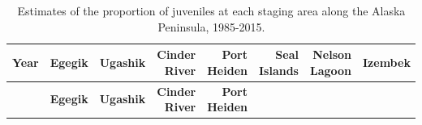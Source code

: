 \documentclass[]{article}
\begin{document}
\newpage

\noindent

\begin{longtable}[]{@{}rrrrrrrr@{}}
\caption{Estimates of the proportion of juveniles at each staging area
along the Alaska Peninsula, 1985-2015.}\tabularnewline
\toprule
\begin{minipage}[b]{0.08\columnwidth}\raggedleft\strut
\textbf{Year}\strut
\end{minipage} & \begin{minipage}[b]{0.10\columnwidth}\raggedleft\strut
\textbf{Egegik}\strut
\end{minipage} & \begin{minipage}[b]{0.11\columnwidth}\raggedleft\strut
\textbf{Ugashik}\strut
\end{minipage} & \begin{minipage}[b]{0.08\columnwidth}\raggedleft\strut
\textbf{Cinder River}\strut
\end{minipage} & \begin{minipage}[b]{0.14\columnwidth}\raggedleft\strut
\textbf{Port Heiden}\strut
\end{minipage} & \begin{minipage}[b]{0.09\columnwidth}\raggedleft\strut
\textbf{Seal Islands}\strut
\end{minipage} & \begin{minipage}[b]{0.08\columnwidth}\raggedleft\strut
\textbf{Nelson Lagoon}\strut
\end{minipage} & \begin{minipage}[b]{0.10\columnwidth}\raggedleft\strut
\textbf{Izembek}\strut
\end{minipage}\tabularnewline
\midrule
\endfirsthead
\toprule
\begin{minipage}[b]{0.08\columnwidth}\raggedleft\strut
~\strut
\end{minipage} & \begin{minipage}[b]{0.10\columnwidth}\raggedleft\strut
\textbf{Egegik}\strut
\end{minipage} & \begin{minipage}[b]{0.11\columnwidth}\raggedleft\strut
\textbf{Ugashik}\strut
\end{minipage} & \begin{minipage}[b]{0.08\columnwidth}\raggedleft\strut
\textbf{Cinder River}\strut
\end{minipage} & \begin{minipage}[b]{0.14\columnwidth}\raggedleft\strut
\textbf{Port Heiden}\strut
\end{minipage} & \begin{minipage}[b]{0.09\columnwidth}\raggedleft\strut

\end{minipage}
\end{longtable}
\end{document}
